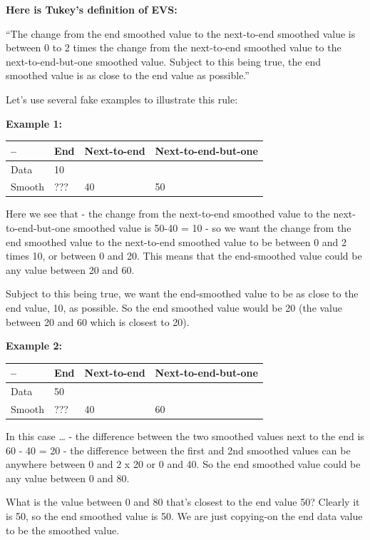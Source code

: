 \documentclass[
]{book}
\begin{document}
\textbf{Here is Tukey's definition of EVS:}

``The change from the end smoothed value to the next-to-end smoothed value is between 0 to 2 times the change from the next-to-end smoothed value to the next-to-end-but-one smoothed value. Subject to this being true, the end smoothed value is as close to the end value as possible.''

Let's use several fake examples to illustrate this rule:

\textbf{Example 1:}

\begin{longtable}[]{@{}llll@{}}
\toprule
-- & End & Next-to-end & Next-to-end-but-one \\
\midrule
\endhead
Data & 10 & & \\
Smooth & ??? & 40 & 50 \\
\bottomrule
\end{longtable}

Here we see that
- the change from the next-to-end smoothed value to the next-to-end-but-one smoothed value is 50-40 = 10
- so we want the change from the end smoothed value to the next-to-end smoothed value to be between 0 and 2 times 10, or between 0 and 20. This means that the end-smoothed value could be any value between 20 and 60.

Subject to this being true, we want the end-smoothed value to be as close to the end value, 10, as possible. So the end smoothed value would be 20 (the value between 20 and 60 which is closest to 20).

\textbf{Example 2:}

\begin{longtable}[]{@{}llll@{}}
\toprule
-- & End & Next-to-end & Next-to-end-but-one \\
\midrule
\endhead
Data & 50 & & \\
Smooth & ??? & 40 & 60 \\
\bottomrule
\end{longtable}

In this case \ldots{}
- the difference between the two smoothed values next to the end is 60 - 40 = 20
- the difference between the first and 2nd smoothed values can be anywhere between 0 and 2 x 20 or 0 and 40. So the end smoothed value could be any value between 0 and 80.

What is the value between 0 and 80 that's closest to the end value 50? Clearly it is 50, so the end smoothed value is 50. We are just copying-on the end data value to be the smoothed value.
\end{document}
